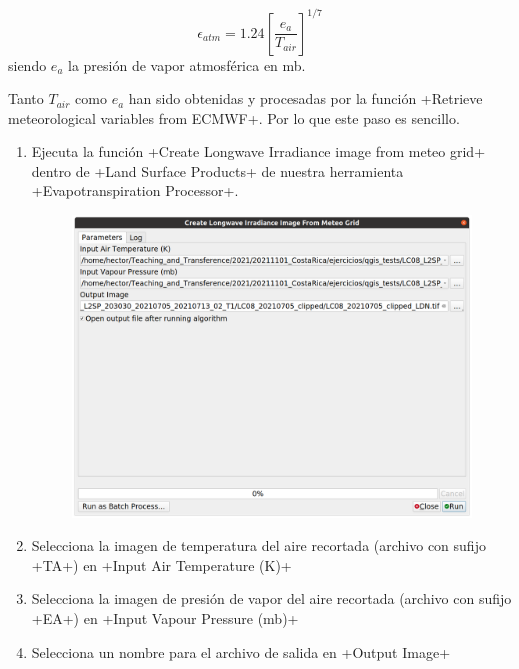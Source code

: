 \documentclass[a4paper,11pt]{article}
\begin{document}
    \begin{equation*}
     \epsilon_{atm} = 1.24 \left[\frac{e_a}{T_{air}}\right]^{1/7}
    \end{equation*}
    siendo $e_a$ la presión de vapor atmosférica en mb.
    
    Tanto $T_{air}$ como $e_a$ han sido obtenidas y procesadas por la función \cverb+Retrieve meteorological variables from ECMWF+. Por lo que este paso es sencillo.
    
    \begin{enumerate}
     \item Ejecuta la función \cverb+Create Longwave Irradiance image from meteo grid+ dentro de \cverb+Land Surface Products+ de nuestra herramienta\\
     \cverb+Evapotranspiration Processor+.
     
     \begin{figure}[H]\centering
      \includegraphics[width=\textwidth]{qgis_ldn_from_grid}
     \end{figure}
     
     \item Selecciona la imagen de temperatura del aire recortada (archivo con sufijo \cverb+TA+) en \cverb+Input Air Temperature (K)+
     
     \item Selecciona la imagen de presión de vapor del aire recortada (archivo con sufijo \cverb+EA+) en \cverb+Input Vapour Pressure (mb)+
     
     \item Selecciona un nombre para el archivo de salida en \cverb+Output Image+
    \end{enumerate}
    
\end{document}
